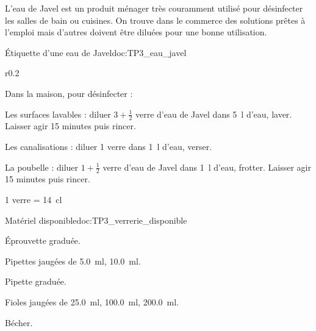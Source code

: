 \begin{contexte}
  L'eau de Javel est un produit ménager très couramment utilisé pour désinfecter les salles
de bain ou cuisines.
  On trouve dans le commerce des solutions prêtes à l’emploi mais d’autres
doivent être diluées pour une bonne utilisation.

\end{contexte}

\begin{doc}{Étiquette d'une eau de Javel}{doc:TP3_eau_javel}
  \begin{wrapfigure}{r}{0.2\linewidth}
    \vspace*{-16pt}
    \centering
    ~
  \end{wrapfigure}
  
  Dans la maison, pour désinfecter :
  \begin{listePoints}
    \item Les surfaces lavables : diluer $3 + \frac{1}{2}$ verre d’eau de Javel dans \qty{5}{\litre} d’eau, laver.
    Laisser agir 15 minutes puis rincer.
    \item Les canalisations : diluer 1 verre dans \qty{1}{\litre} d’eau, verser.
    \item La poubelle : diluer $1 + \frac{1}{2}$ verre d’eau de Javel dans \qty{1}{\litre} d’eau, frotter.
    Laisser agir 15 minutes puis rincer.
  \end{listePoints}
  \begin{donnees}
    \item \num{1} verre = \qty{14}{\centi\litre}
  \end{donnees}
\end{doc}

\begin{doc}{Matériel disponible}{doc:TP3_verrerie_disponible}
  \begin{listePoints}
    \item Éprouvette graduée.
    \item Pipettes jaugées de \qty{5,0}{\ml}, \qty{10,0}{\ml}.
    \item Pipette graduée.
    \item Fioles jaugées de \qty{25,0}{\ml}, \qty{100,0}{\ml}, \qty{200,0}{\ml}.
    \item Bécher.
  \end{listePoints}
\end{doc}

